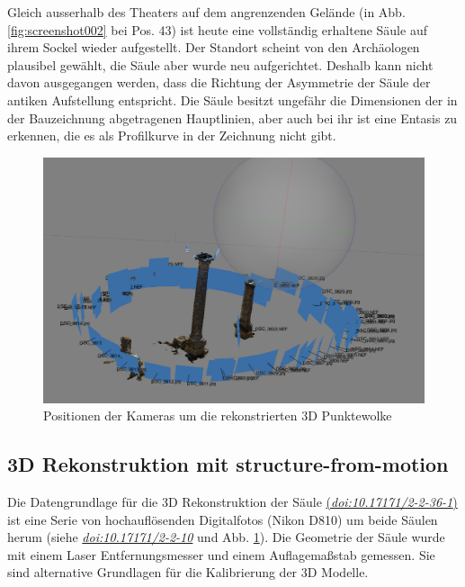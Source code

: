 \documentclass[twocolumn]{bmcart}
\begin{document}
 Gleich ausserhalb des Theaters auf dem angrenzenden Gelände (in Abb. \ref{fig:screenshot002} bei Pos. 43) ist heute eine vollständig erhaltene Säule auf ihrem Sockel wieder aufgestellt. Der Standort scheint von den Archäologen plausibel gewählt, die Säule aber wurde neu aufgerichtet. Deshalb kann nicht davon ausgegangen werden, dass die Richtung der Asymmetrie der Säule der antiken Aufstellung entspricht. Die Säule besitzt ungefähr die Dimensionen der in der Bauzeichnung abgetragenen Hauptlinien, aber auch bei ihr ist eine Entasis zu erkennen, die es als Profilkurve in der Zeichnung nicht gibt. 


\begin{figure}[h]
	\centering
	\includegraphics[width=1\linewidth]{figures/screenshot008}
	\caption{Positionen der Kameras um die rekonstrierten 3D Punktewolke}
	\label{fig:screenshot008}
\end{figure}


\subsection{3D Rekonstruktion mit structure-from-motion}

Die Datengrundlage für die 3D Rekonstruktion der Säule \href{http://dx.doi.org/10.17171/2-2-36-1}{(\textit{doi:10.17171/2-2-36-1})} ist eine Serie von hochauflösenden Digitalfotos (Nikon D810) um beide Säulen herum (siehe \href{http://dx.doi.org/10.17171/2-2-10}{\textit{doi:10.17171/2-2-10}} und Abb. \ref{fig:screenshot008}). Die Geometrie der Säule wurde mit einem Laser Entfernungsmesser und einem Auflagemaßstab gemessen. Sie sind alternative Grundlagen für die Kalibrierung der 3D Modelle. 
\end{document}
